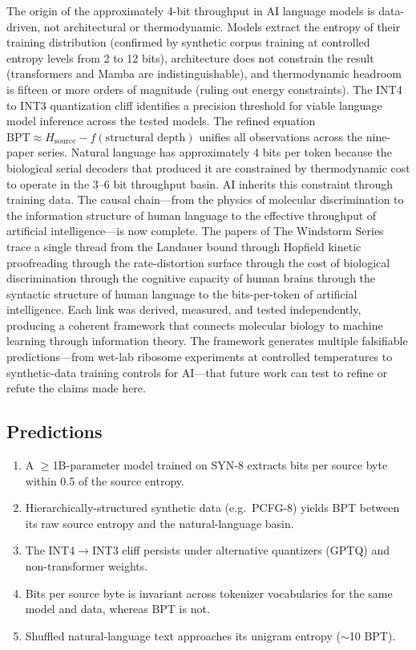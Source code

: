 \documentclass[11pt]{article}
\begin{document}
The origin of the approximately 4-bit throughput in AI language models is data-driven, not architectural or thermodynamic. Models extract the entropy of their training distribution (confirmed by synthetic corpus training at controlled entropy levels from 2 to 12 bits), architecture does not constrain the result (transformers and Mamba are indistinguishable), and thermodynamic headroom is fifteen or more orders of magnitude (ruling out energy constraints). The INT4 to INT3 quantization cliff identifies a precision threshold for viable language model inference across the tested models. The refined equation $\mathrm{BPT} \approx H_{\mathrm{source}} - f(\text{structural depth})$ unifies all observations across the nine-paper series. Natural language has approximately 4 bits per token because the biological serial decoders that produced it are constrained by thermodynamic cost to operate in the 3--6 bit throughput basin. AI inherits this constraint through training data. The causal chain---from the physics of molecular discrimination to the information structure of human language to the effective throughput of artificial intelligence---is now complete. The papers of The Windstorm Series trace a single thread from the Landauer bound through Hopfield kinetic proofreading through the rate-distortion surface through the cost of biological discrimination through the cognitive capacity of human brains through the syntactic structure of human language to the bits-per-token of artificial intelligence. Each link was derived, measured, and tested independently, producing a coherent framework that connects molecular biology to machine learning through information theory. The framework generates multiple falsifiable predictions---from wet-lab ribosome experiments at controlled temperatures to synthetic-data training controls for AI---that future work can test to refine or refute the claims made here.

\subsection*{Predictions}

\begin{enumerate}
    \item A $\geq$1B-parameter model trained on SYN-8 extracts bits per source byte within 0.5 of the source entropy.
    \item Hierarchically-structured synthetic data (e.g.\ PCFG-8) yields BPT between its raw source entropy and the natural-language basin.
    \item The INT4$\to$INT3 cliff persists under alternative quantizers (GPTQ) and non-transformer weights.
    \item Bits per source byte is invariant across tokenizer vocabularies for the same model and data, whereas BPT is not.
    \item Shuffled natural-language text approaches its unigram entropy ($\sim$10 BPT).
\end{enumerate}
\end{document}
